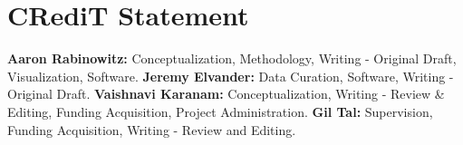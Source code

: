 \section{CRediT Statement}

\noindent\textbf{Aaron Rabinowitz:} Conceptualization, Methodology, Writing - Original Draft, Visualization, Software. \textbf{Jeremy Elvander:} Data Curation, Software, Writing - Original Draft. \textbf{Vaishnavi Karanam:} Conceptualization, Writing - Review \& Editing, Funding Acquisition, Project Administration. \textbf{Gil Tal:} Supervision, Funding Acquisition, Writing - Review and Editing.